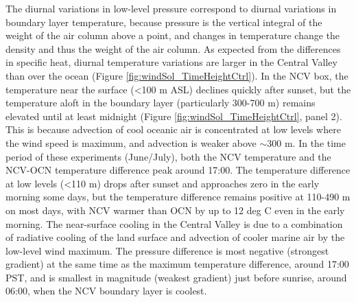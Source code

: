The diurnal variations in low-level pressure correspond to diurnal variations in boundary layer temperature, because pressure is the vertical integral of the weight of the air column above a point, and changes in temperature change the density and thus the weight of the air column.  As expected from the differences in specific heat, diurnal temperature variations are larger in the Central Valley than over the ocean (Figure \ref{fig:windSol_TimeHeightCtrl}).  In the NCV box, the temperature near the surface (\textless 100 m ASL) declines quickly after sunset, but the temperature aloft in the boundary layer (particularly 300-700 m) remains elevated until at least midnight (Figure \ref{fig:windSol_TimeHeightCtrl}, panel 2).  This is because advection of cool oceanic air is concentrated at low levels where the wind speed is maximum, and advection is weaker above $\sim$300 m.  In the time period of these experiments (June/July), both the NCV temperature and the NCV-OCN temperature difference peak around 17:00.  The temperature difference at low levels (\textless 110 m) drops after sunset and approaches zero in the early morning some days, but the temperature difference remains positive at 110-490 m on most days, with NCV warmer than OCN by up to 12 deg C even in the early morning.  The near-surface cooling in the Central Valley is due to a combination of radiative cooling of the land surface and advection of cooler marine air by the low-level wind maximum.  The pressure difference is most negative (strongest gradient) at the same time as the maximum temperature difference, around 17:00 PST, and is smallest in magnitude (weakest gradient) just before sunrise, around 06:00, when the NCV boundary layer is coolest.  

